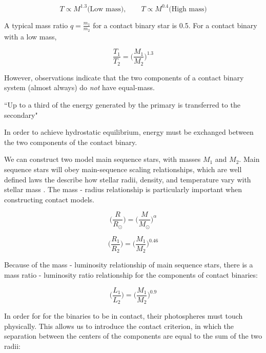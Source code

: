 \documentclass[12pt]{article} %
\numberwithin{equation}{section} %
\begin{document}
\begin{equation} \label{homology_T_reprint}
T \propto M^{1.3} \text{(Low mass)}, \qquad T \propto M^{0.4} \text{(High mass)} 
\end{equation}

A typical mass ratio $q = \frac{m_{1}}{m_{2}}$ for a contact binary star is 0.5. For a contact binary with a low mass,

\begin{equation}
\frac{T_{1}}{T_{2}} = \Big( \frac{M_{1}}{M_{2}} \Big)^{1.3}
\end{equation}

However, observations indicate that the two components of a contact binary system (almost always) do \emph{not} have equal-mass. 

``Up to a third of the energy generated by the primary is transferred to the secondary"\citep{mochnacki1981contact}

In order to achieve hydrostatic equilibrium, energy must be exchanged between the two components of the contact binary.

We can construct two model main sequence stars, with masses $M_{1}$ and $M_{2}$. Main sequence stars will obey main-sequence scaling relationships, which are well defined laws the describe how stellar radii, density, and temperature vary with stellar mass \citep{kippenhahn1990stellar}. The mass - radius relationship is particularly important when constructing contact models. 

\begin{equation} \label{eqn: mass_radius}
 \bigg( \frac{R}{R_{\odot}} \bigg) = \bigg( \frac{M}{M_{\odot}} \bigg)^{\alpha}
\end{equation}

\begin{equation} \label{eqn: roche_mass_radius}
\bigg( \frac{R_{1}}{R_{2}} \bigg) = \bigg( \frac{M_{1}}{M_{2}} \bigg)^{0.46}
\end{equation}

Because of the mass - luminosity relationship of main sequence stars, there is a mass ratio - luminosity ratio relationship for the components of contact binaries: 

\begin{equation} \label{eqn: luminosity_radius}
\bigg( \frac{L_{1}}{L_{2}} \bigg) = \bigg( \frac{M_{1}}{M_{2}} \bigg)^{0.9}
\end{equation}


In order for for the binaries to be in contact, their photospheres must touch physically. This allows us to introduce the contact criterion, in which the separation between the centers of the components are equal to the sum of the two radii:
\end{document}
